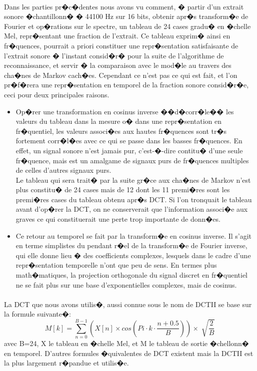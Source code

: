 {\paragraph{}
	Dans les parties pr�c�dentes nous avons vu comment, � partir d'un extrait sonore �chantillonn� � 44100 Hz sur 16 bits, 
	obtenir apr�s transform�e de Fourier et op�rations sur le spectre, un tableau de 24 cases gradu� en �chelle Mel, 
	repr�sentant une fraction de l'extrait. Ce tableau exprim� ainsi en fr�quences, pourrait a priori constituer une 
	repr�sentation satisfaisante de l'extrait sonore � l'instant consid�r� pour la suite de l'algorithme de reconnaissance, 
	et servir � la comparaison avec le mod�le au travers des cha�nes de Markov cach�es. Cependant ce n'est pas ce qui est fait, 
	et l'on pr�f�rera une repr�sentation en temporel de la fraction sonore consid�r�e, ceci pour deux principales raisons.
\begin{itemize}
\item Op�rer une transformation en cosinus inverse ��d�corr�le�� les valeurs du tableau dans la mesure o� dans une repr�sentation 
en fr�quentiel, les valeurs associ�es aux hautes fr�quences sont tr�s fortement corr�l�es avec ce qui se passe dans les 
basses fr�quences. En effet, un signal sonore n'est jamais pur, c'est-�-dire contitu� d'une seule fr�quence, mais est un 
amalgame de signaux purs de fr�quences multiples de celles d'autres signaux purs.\\
Le tableau qui sera trait� par la suite gr�ce aux cha�nes de Markov n'est plus constitu� de 24 cases mais de 12 dont les 
11 premi�res sont les premi�res cases du tableau obtenu apr�s DCT. Si l'on tronquait le tableau avant d'op�rer la DCT, on 
ne conserverait que l'information associ�e aux graves ce qui constituerait une perte trop importante de donn�es. 
\item Ce retour au temporel se fait par la transform�e en cosinus inverse. Il s'agit en terme simplistes du pendant r�el de 
	la transform�e de Fourier inverse,  qui elle donne lieu � des coefficients complexes, lesquels dans le cadre d'une 
	repr�sentation temporelle n'ont que peu de sens. En termes plus math�matiques, la projection orthogonale du signal 
	discret en fr�quentiel ne se fait plus sur une base d'exponentielles complexes, mais de cosinus. 
\end{itemize}
\paragraph{}
	La DCT que nous avons utilis�, aussi connue sous le nom de DCTII se base sur la formule suivante�: 
	\[M[k] = \sum_{n=0}^{B-1}( X[n]\times cos(Pi\cdot k\cdot \frac{n+0.5}{B}) ) \times \sqrt[]{\frac{2}{B}}\] avec B=24, X le tableau en �chelle Mel, 
	et M le tableau de sortie �chellonn� en temporel. D'autres formules �quivalentes de DCT existent mais la 
	DCTII est la plus largement r�pandue et utilis�e.
}

